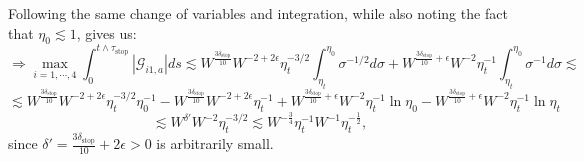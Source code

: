 \documentclass[11pt]{article}
\newcommand{\sto}{\text{stop}}
\begin{document}
Following the same change of variables and integration, while also noting the fact that $\eta_0\lesssim 1$, gives us:
$$\Rightarrow \max_{i=1, \cdots, 4}\int_{0}^{t\wedge \tau_\sto}|\mathcal{G}_{i1, a}|ds\lesssim W^{\frac{3\delta_\sto}{10}}W^{-2+2\epsilon}\eta_t^{-3/2}\int_{\eta_t}^{\eta_0}\sigma^{-1/2}d\sigma + W^{\frac{3\delta_\sto}{10}+\epsilon}W^{-2}\eta_t^{-1}\int_{\eta_t}^{\eta_0}\sigma^{-1}d\sigma\lesssim$$
$$\lesssim W^{\frac{3\delta_\sto}{10}}W^{-2+2\epsilon}\eta_t^{-3/2}\eta_0^{-1}-W^{\frac{3\delta_\sto}{10}}W^{-2+2\epsilon}\eta_t^{-1}+W^{\frac{3\delta_\sto}{10}+\epsilon}W^{-2}\eta_t^{-1}\ln \eta_0-W^{\frac{3\delta_\sto}{10}+\epsilon}W^{-2}\eta_t^{-1}\ln \eta_t$$
$$\lesssim W^{\delta'}W^{-2}\eta_t^{-3/2}\lesssim W^{-\frac{3}{4}}\eta_t^{-1}W^{-1}\eta_t^{-\frac{1}{2}},$$
since $\delta' = \frac{3\delta_\sto}{10}+2\epsilon>0$ is arbitrarily small. 
\end{document}
